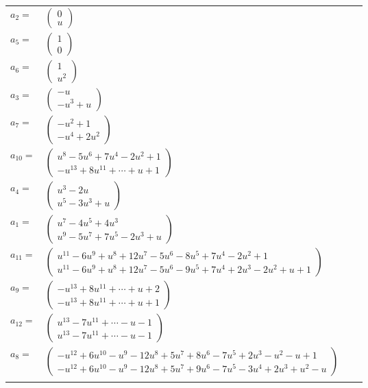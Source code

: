 \documentclass[1p]{elsarticle_modified}
\theoremstyle{definition}
\begin{document}
\begin{tabular}{m{7pt} m{180pt} m{7pt} m{180pt} }
\flushright $a_{2}=$&$\begin{pmatrix}0\\u\end{pmatrix}$ \\
\flushright $a_{5}=$&$\begin{pmatrix}1\\0\end{pmatrix}$ \\
\flushright $a_{6}=$&$\begin{pmatrix}1\\u^2\end{pmatrix}$ \\
\flushright $a_{3}=$&$\begin{pmatrix}- u\\- u^3+u\end{pmatrix}$ \\
\flushright $a_{7}=$&$\begin{pmatrix}- u^2+1\\- u^4+2 u^2\end{pmatrix}$ \\
\flushright $a_{10}=$&$\begin{pmatrix}u^8-5 u^6+7 u^4-2 u^2+1\\- u^{13}+8 u^{11}+\cdots+u+1\end{pmatrix}$ \\
\flushright $a_{4}=$&$\begin{pmatrix}u^3-2 u\\u^5-3 u^3+u\end{pmatrix}$ \\
\flushright $a_{1}=$&$\begin{pmatrix}u^7-4 u^5+4 u^3\\u^9-5 u^7+7 u^5-2 u^3+u\end{pmatrix}$ \\
\flushright $a_{11}=$&$\begin{pmatrix}u^{11}-6 u^9+u^8+12 u^7-5 u^6-8 u^5+7 u^4-2 u^2+1\\u^{11}-6 u^9+u^8+12 u^7-5 u^6-9 u^5+7 u^4+2 u^3-2 u^2+u+1\end{pmatrix}$ \\
\flushright $a_{9}=$&$\begin{pmatrix}- u^{13}+8 u^{11}+\cdots+u+2\\- u^{13}+8 u^{11}+\cdots+u+1\end{pmatrix}$ \\
\flushright $a_{12}=$&$\begin{pmatrix}u^{13}-7 u^{11}+\cdots- u-1\\u^{13}-7 u^{11}+\cdots- u-1\end{pmatrix}$ \\
\flushright $a_{8}=$&$\begin{pmatrix}- u^{12}+6 u^{10}- u^9-12 u^8+5 u^7+8 u^6-7 u^5+2 u^3- u^2- u+1\\- u^{12}+6 u^{10}- u^9-12 u^8+5 u^7+9 u^6-7 u^5-3 u^4+2 u^3+u^2- u\end{pmatrix}$\\&\end{tabular}
\end{document}
